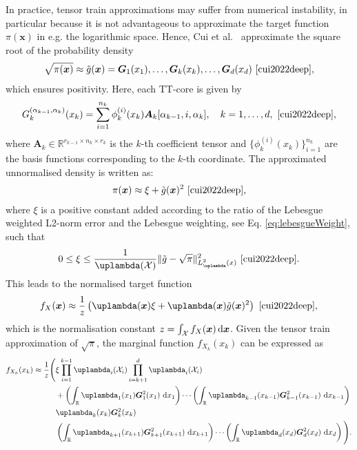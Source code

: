 In practice, tensor train approximations may suffer from numerical instability, in particular because it is not advantageous to approximate the target function $\pi(\bm{x})$ in e.g. the logarithmic space. 
Hence, Cui et al.~\cite{cui2022deep} approximate the square root of the probability density
\begin{align}
	\sqrt{\pi(\bm{x})} \approx \tilde{g}(\bm{x}) = \bm{G}_1(x_1), \dots, \bm{G}_k(x_k), \dots, \bm{G}_d(x_d)\, \,  \text{\cite[Eq. 18]{cui2022deep}},
\end{align}
which ensures positivity.
Here, each TT-core is given by
\begin{equation}
	G^{(\alpha_{k-1},\alpha_k)}_k(x_k) = \sum_{i=1}^{n_k} \phi^{(i)}_k(x_k) \bm{A}_k[\alpha_{k-1}, i, \alpha_k], \quad k = 1, \dots, d,\, \,  \text{\cite[Eq. 21]{cui2022deep}},
\end{equation}
where $\bm{A}_k \in \mathbb{R}^{r_{k-1} \times n_k \times r_k}$ is the $k$-th coefficient tensor and $\{\phi^{(i)}_k(x_k)\}_{i=1}^{n_k}$ are the basis functions corresponding to the $k$-th coordinate.
The approximated unnormalised density is written as:
\begin{align}
	\pi(\bm{x}) \approx \xi + \tilde{g}(\bm{x})^2\, \,  \text{\cite[Eq. 19]{cui2022deep}},
\end{align}
where $\xi$ is a positive constant added according to the ratio of the Lebesgue weighted L2-norm error and the Lebesgue weighting, see Eq. \ref{eq:lebesgueWeight}, such that
\begin{align}
	0 \leq \xi \leq \frac{1}{\uplambda(\mathcal{X})} \lVert \tilde{g} - \sqrt{\pi} \rVert_{L^2_{\uplambda}(x)}^2\, \,  \text{\cite[Eq. 35]{cui2022deep}}.
\end{align}
This leads to the normalised target function
\begin{align}
	f_X(\bm{x})  \approx \frac{1}{z} \left( \uplambda(\bm{x}) \xi  + \uplambda(\bm{x}) \tilde{g}(\bm{x})^2 \right)\, \,  \text{\cite[Eq. 19]{cui2022deep}},
\end{align}
which is the normalisation constant $z = \int_{\mathcal{X}} f_X(\bm{x}) \mathop{}\!\mathrm{d} \bm{x} $.
Given the tensor train approximation of $\sqrt{\pi}$, the marginal function $f_{X_k}(x_k)$ can be expressed as
\begin{align}
	\begin{split}
		f_{X_k}(x_k)  \approx \frac{1}{z} \Bigg(&\xi \prod_{i=1}^{k-1} \uplambda_i(\mathcal{X}_i) \prod_{i=k+1}^{d} \uplambda_i(\mathcal{X}_i) \\
		&+ \left( \int_{\mathbb{R}} \uplambda_1(x_1) \bm{G}_1^2(x_1)  \, \diff x_1 \right) \cdots 
		\left( \int_{\mathbb{R}} \uplambda_{k-1}(x_{k-1}) \bm{G}_{k-1}^2(x_{k-1}) \, \diff x_{k-1} \right) \\
		& \uplambda_k(x_k) \bm{G}_k^2(x_k)  \\
		&\left( \int_{\mathbb{R}} \uplambda_{k+1}(x_{k+1}) \bm{G}_{k+1}^2(x_{k+1})  \,\diff x_{k+1} \right) \cdots 
		\left( \int_{\mathbb{R}} \uplambda_d(x_d) \bm{G}_d^2(x_d)  \, \diff x_d \right) \Bigg).
	\end{split}
\end{align}




